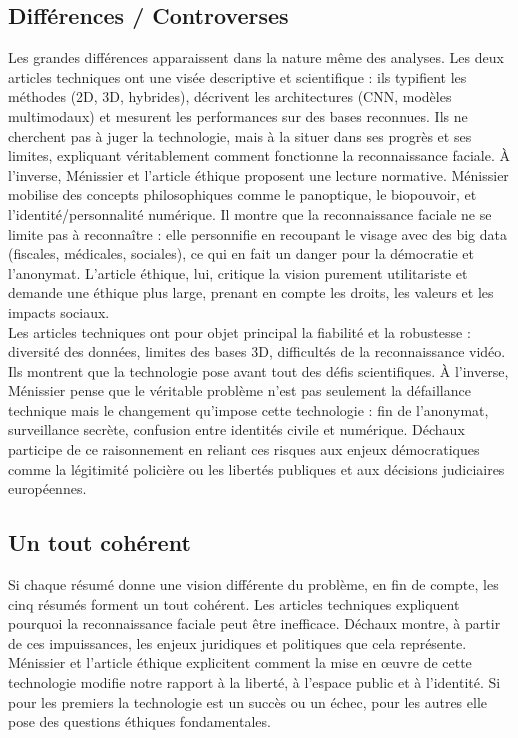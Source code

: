 \documentclass[11pt]{article}
\begin{document}
\subsection{Différences / Controverses}
Les grandes différences apparaissent dans la nature même des analyses. Les deux articles techniques ont une visée descriptive et 
scientifique : ils typifient les méthodes (2D, 3D, hybrides), décrivent les architectures (CNN, modèles multimodaux) et mesurent 
les performances sur des bases reconnues. Ils ne cherchent pas à juger la technologie, mais à la situer dans ses progrès et ses 
limites, expliquant véritablement comment fonctionne la reconnaissance faciale. À l’inverse, Ménissier et l’article éthique 
proposent une lecture normative. Ménissier mobilise des concepts philosophiques comme le panoptique, le biopouvoir, et 
l’identité/personnalité numérique. Il montre que la reconnaissance faciale ne se limite pas à reconnaître : elle personnifie en 
recoupant le visage avec des big data (fiscales, médicales, sociales), ce qui en fait un danger pour la démocratie et 
l’anonymat. L’article éthique, lui, critique la vision purement utilitariste et demande une éthique plus large, prenant en 
compte les droits, les valeurs et les impacts sociaux.\\
Les articles techniques ont pour objet principal la fiabilité et la robustesse : diversité des données, limites des bases 3D, 
difficultés de la reconnaissance vidéo. Ils montrent que la technologie pose avant tout des défis scientifiques. À l’inverse, 
Ménissier pense que le véritable problème n’est pas seulement la défaillance technique mais le changement qu’impose cette 
technologie : fin de l’anonymat, surveillance secrète, confusion entre identités civile et numérique. Déchaux participe de ce 
raisonnement en reliant ces risques aux enjeux démocratiques comme la légitimité policière ou les libertés publiques et aux 
décisions judiciaires européennes.


\subsection{Un tout cohérent}
Si chaque résumé donne une vision différente du problème, en fin de compte, les cinq résumés forment un tout cohérent. Les 
articles techniques expliquent pourquoi la reconnaissance faciale peut être inefficace. Déchaux montre, à partir de ces 
impuissances, les enjeux juridiques et politiques que cela représente. Ménissier et l’article éthique explicitent comment la 
mise en œuvre de cette technologie modifie notre rapport à la liberté, à l’espace public et à l’identité. Si pour les premiers 
la technologie est un succès ou un échec, pour les autres elle pose des questions éthiques fondamentales.
\end{document}
